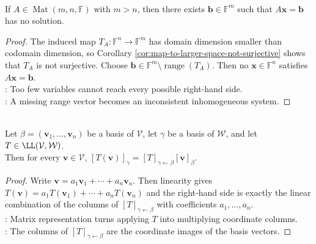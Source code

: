 \begin{corollary} \label{cor:inhomogeneous-system-more-equations-than-variables} \\
If $A\in\operatorname{Mat}(m,n,\mathbb{F})$ with $m>n$, then there exists $\mathbf{b}\in\mathbb{F}^m$ such that $A\mathbf{x}=\mathbf{b}$ has no solution.
\begin{proof}
The induced map $T_A:\mathbb{F}^n\to\mathbb{F}^m$ has domain dimension smaller than codomain dimension, so Corollary \ref{cor:map-to-larger-space-not-surjective} shows that $T_A$ is not surjective. Choose $\mathbf{b}\in\mathbb{F}^m\setminus\operatorname{range}(T_A)$. Then no $\mathbf{x}\in\mathbb{F}^n$ satisfies $A\mathbf{x}=\mathbf{b}$.\\
: Too few variables cannot reach every possible right-hand side.\\
: A missing range vector becomes an inconsistent inhomogeneous system.
\end{proof}
\end{corollary}

\begin{proposition} \label{prop:matrix-representation-action} \\
Let $\beta=(\mathbf{v}_1,\ldots,\mathbf{v}_n)$ be a basis of $\mathcal{V}$, let $\gamma$ be a basis of $\mathcal{W}$, and let $T\in\LL(\mathcal{V},\mathcal{W})$.\\
Then for every $\mathbf{v} \in \mathcal{V}$, $[T(\mathbf{v})]_{\gamma} = [T]_{\gamma \leftarrow \beta}[\mathbf{v}]_{\beta}$.
\begin{proof}
Write $\mathbf{v} = a_1\mathbf{v}_1 + \cdots + a_n\mathbf{v}_n$. Then linearity gives $T(\mathbf{v}) = a_1T(\mathbf{v}_1) + \cdots + a_nT(\mathbf{v}_n)$ and the right-hand side is exactly the linear combination of the columns of $[T]_{\gamma \leftarrow \beta}$ with coefficients $a_1,\ldots,a_n$.\\
: Matrix representation turns applying $T$ into multiplying coordinate columns.\\
: The columns of $[T]_{\gamma \leftarrow \beta}$ are the coordinate images of the basis vectors.
\end{proof}
\end{proposition}

